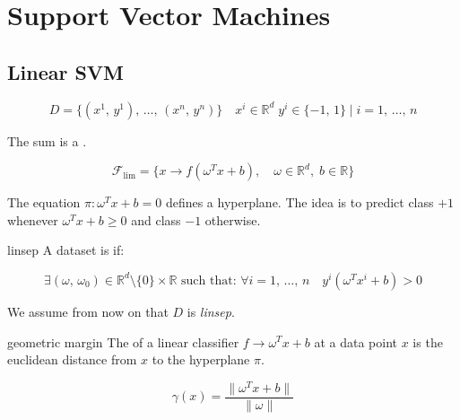 \section{Support Vector Machines}

\subsection{Linear SVM}
\label{sec:linear-svm}

\begin{equation*}
	D = \{ (x^1,\, y^1),\, \dots,\, (x^n,\, y^n) \} \quad  x^i \in \mathds{R}^d \; y^i \in \{-1,\, 1\} \mid i = 1,\, \dots,\, n
\end{equation*}

The sum is a .

\begin{equation}
	\mathcal{F}_{\text{lim}} = \{x \to f\left(\omega^Tx + b\right),\quad \omega \in \mathds{R}^d, \; b \in \mathds{R} \}
\end{equation}

The equation $\pi : \omega^Tx + b = 0$ defines a hyperplane.
The idea is to predict class $+1$ whenever $\omega^Tx + b \geq 0$ and class $-1$ otherwise.

\begin{definition}{linsep}{}
	A dataset is  if:

	\begin{equation*}
		\exists (\omega,\, \omega_0) \in \mathds{R}^d \setminus \{0\} \times \mathds{R}
		\text{ such that: }
		\forall i=1,\,\dots,\,n\quad y^i(\omega^Tx^i +b) > 0
	\end{equation*}
\end{definition}

We assume from now on that $D$ is \emph{linsep}.

\begin{definition}{geometric margin}{}
	The  of a linear
	classifier $f \to \omega^Tx + b$ at a data point $x$ is the
	euclidean distance from $x$ to the hyperplane $\pi$.

	\begin{equation*}
		\gamma(x) = \frac{\lVert\omega^Tx + b\rVert}{\lVert\omega\rVert} \tag{geometric margin}
	\end{equation*}
\end{definition}

